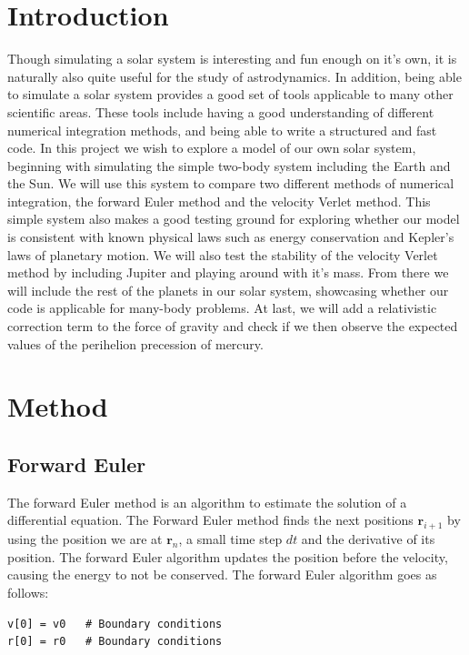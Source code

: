 \documentclass{article}
\begin{document}
\begin{multicols}{2}

\section{Introduction}

Though simulating a solar system is interesting and fun enough on it's own, it is naturally also quite useful for the study of astrodynamics. In addition, being able to simulate a solar system provides a good set of tools applicable to many other scientific areas. These tools include having a good understanding of different numerical integration methods, and being able to write a structured and fast code. In this project we wish to explore a model of our own solar system, beginning with simulating the simple two-body system including the Earth and the Sun. We will use this system to compare two different methods of numerical integration, the forward Euler method and the velocity Verlet method. This simple system also makes a good testing ground for exploring whether our model is consistent with known physical laws such as energy conservation and Kepler's laws of planetary motion. We will also test the stability of the velocity Verlet method by including Jupiter and playing around with it's mass. From there we will include the rest of the planets in our solar system, showcasing whether our code is applicable for many-body problems. At last, we will add a relativistic correction term to the force of gravity and check if we then observe the expected values of the perihelion precession of mercury.

\section{Method}
\subsection{Forward Euler}
The forward Euler method is an algorithm to estimate the solution of a differential equation. The Forward Euler method  finds the next positions $\mathbf{r}_{i+1}$ by using the position we are at $\mathbf{r}_{n}$, a small time step $dt$ and the derivative of its position. The forward Euler algorithm updates the position before the velocity, causing the energy to not be conserved.  
The forward Euler algorithm goes as follows:
\begin{verbatim}
v[0] = v0   # Boundary conditions
r[0] = r0   # Boundary conditions


\end{verbatim}
\end{multicols}
\end{document}
